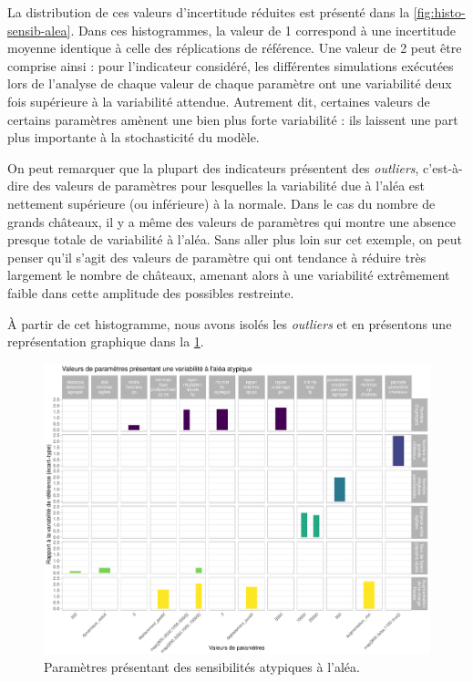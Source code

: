 La distribution de ces valeurs d'incertitude réduites est présenté dans la \cref{fig:histo-sensib-alea}.
Dans ces histogrammes, la valeur de 1 correspond à une incertitude moyenne identique à celle des réplications de référence.
Une valeur de 2 peut être comprise ainsi : pour l'indicateur considéré, les différentes simulations exécutées lors de l'analyse de chaque valeur de chaque paramètre ont une variabilité deux fois supérieure à la variabilité attendue.
Autrement dit, certaines valeurs de certains paramètres amènent une bien plus forte variabilité : ils laissent une part plus importante à la stochasticité du modèle.

On peut remarquer que la plupart des indicateurs présentent des \textit{outliers}, c'est-à-dire des valeurs de paramètres pour lesquelles la variabilité due à l'aléa est nettement supérieure (ou inférieure) à la normale.
Dans le cas du nombre de grands châteaux, il y a même des valeurs de paramètres qui montre une absence presque totale de variabilité à l'aléa.
Sans aller plus loin sur cet exemple, on peut penser qu'il s'agit des valeurs de paramètre qui ont tendance à réduire très largement le nombre de châteaux, amenant alors à une variabilité extrêmement faible dans cette amplitude des possibles restreinte.

À partir de cet histogramme, nous avons isolés les \textit{outliers} et en présentons une représentation graphique dans la \cref{fig:sensib-alea}.
\begin{figure}[H]
	\centering
	\includegraphics[width=\linewidth]{img/sensibilite_alea_outliers.pdf}
	\caption{Paramètres présentant des sensibilités atypiques à l'aléa.}
	\label{fig:sensib-alea}
\end{figure}

